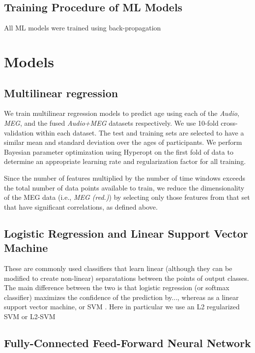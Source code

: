 \documentclass[utf8]{frontiersSCNS} %
\begin{document}
\subsection{Training Procedure of ML Models}

All ML models were trained using back-propagation 

\section{Models}

\subsection{Multilinear regression}

We train multilinear regression models to predict age using each of the \textit{Audio}, \textit{MEG}, and the fused \textit{Audio+MEG} datasets respectively. We use 10-fold cross-validation within each dataset. The test and training sets are selected to have a similar mean and standard deviation over the ages of participants. We perform Bayesian parameter optimization using Hyperopt \cite{Bergstra2013} on the first fold of data to determine an appropriate learning rate and regularization factor for all training.

Since the number of features multiplied by the number of time windows exceeds the total number of data points available to train, we reduce the dimensionality of the MEG data (i.e., {\em MEG (red.)}) by selecting only those features from that set that have significant correlations, as defined above.

\subsection{Logistic Regression and Linear Support Vector Machine}

These are commonly used classifiers that learn linear (although they can be modified to create non-linear) separatations between the points of output classes. The main difference between the two is that logistic regression (or softmax classifier) maximizes the confidence of the prediction by..., whereas as a linear support vector machine, or SVM . Here in particular we use an L2 regularized SVM or L2-SVM

\subsection{Fully-Connected Feed-Forward Neural Network}
\end{document}
